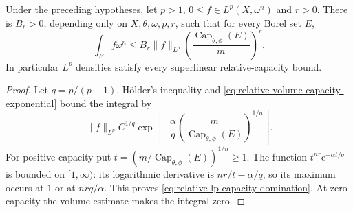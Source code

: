 \begin{corollary}\label{cor:relative-lp-capacity-domination}
Under the preceding hypotheses, let $p>1$, $0\leq f\in L^p(X,\omega^n)$ and $r>0$. There is $B_r>0$, depending only on $X,\theta,\omega,p,r$, such that for every Borel set $E$,
\begin{equation}\label{eq:relative-lp-capacity-domination}
 \int_E f\omega^n\leq B_r\|f\|_{L^p}
           \left(\frac{\operatorname{Cap}_{\theta,\phi}(E)}m\right)^r.
\end{equation}
In particular $L^p$ densities satisfy every superlinear relative-capacity bound.
\end{corollary}
\begin{proof}
Let $q=p/(p-1)$. H\"older's inequality and \eqref{eq:relative-volume-capacity-exponential} bound the integral by
\[
 \|f\|_{L^p}C^{1/q}\exp\left[-\frac\alpha q
       \left(\frac{m}{\operatorname{Cap}_{\theta,\phi}(E)}\right)^{1/n}\right].
\]
For positive capacity put $t=(m/\operatorname{Cap}_{\theta,\phi}(E))^{1/n}\geq1$. The function $t^{nr}\mathrm e^{-\alpha t/q}$ is bounded on $[1,\infty)$: its logarithmic derivative is $nr/t-\alpha/q$, so its maximum occurs at $1$ or at $nrq/\alpha$. This proves \eqref{eq:relative-lp-capacity-domination}. At zero capacity the volume estimate makes the integral zero.
\end{proof}

